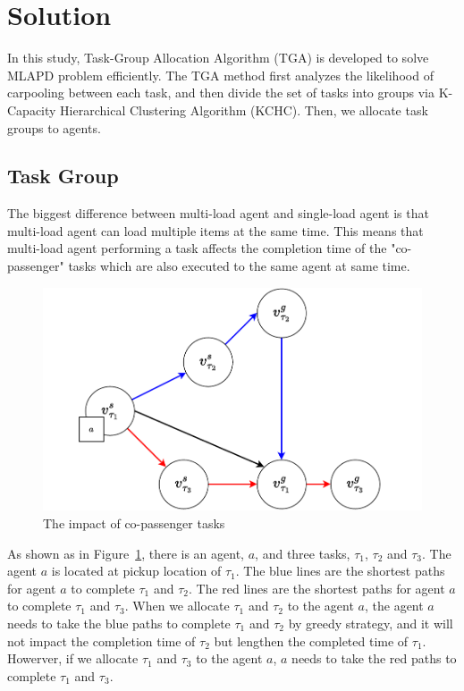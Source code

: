 \documentclass[sigconf,anonymous]{aamas}
\begin{document}
\section{Solution}

In this study, Task-Group Allocation Algorithm (TGA) is developed to solve MLAPD problem efficiently. 
The TGA method first analyzes the likelihood of carpooling between each task, 
and then divide the set of tasks into groups via K-Capacity Hierarchical Clustering Algorithm (KCHC). 
Then, we allocate task groups to agents.

\subsection{Task Group}
The biggest difference between multi-load agent and single-load agent 
is that multi-load agent can load multiple items at the same time. 
This means that multi-load agent performing a task affects the completion time of the "co-passenger" tasks 
which are also executed to the same agent at same time.
\begin{figure}[ht]
  \centering
  \includegraphics[width=0.5\linewidth]{Fig/carpooling.pdf}
  \caption{The impact of co-passenger tasks}
  \label{fig:carpooling}
\end{figure}
As shown as in Figure~\ref{fig:carpooling}, there is an agent, $a$, 
and three tasks, $\tau_{1}$, $\tau_{2}$ and $\tau_{3}$.
The agent $a$ is located at pickup location of $\tau_{1}$.
The blue lines are the shortest paths for agent $a$ to complete $\tau_{1}$ and $\tau_{2}$.
The red lines are the shortest paths for agent $a$ to complete $\tau_{1}$ and $\tau_{3}$.
When we allocate $\tau_{1}$ and $\tau_{2}$ to the agent $a$,
the agent $a$ needs to take the blue paths to complete $\tau_{1}$ and $\tau_{2}$ by greedy strategy,
and it will not impact the completion time of $\tau_{2}$ but lengthen the completed time of $\tau_{1}$.
Howerver, if we allocate $\tau_{1}$ and $\tau_{3}$ to the agent $a$, 
$a$ needs to take the red paths to complete $\tau_{1}$ and $\tau_{3}$.
\end{document}
